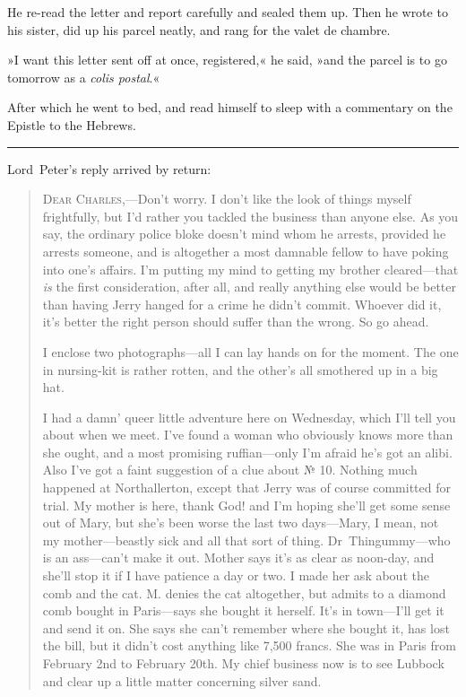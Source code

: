 He re-read the letter and report carefully and sealed them up. Then he wrote to his sister, did up his parcel neatly, and rang for the valet de chambre.

»I want this letter sent off at once, registered,« he said, »and the parcel is to go tomorrow as a \textit{colis postal}.«

After which he went to bed, and read himself to sleep with a commentary on the Epistle to the Hebrews.

\noindent\hfil\rule{0.5\textwidth}{.4pt}\hfil

Lord~Peter's reply arrived by return:

\begin{quotation}

\textsc{Dear Charles},—Don't worry. I don't like the look of things myself frightfully, but I'd rather you tackled the business than anyone else. As you say, the ordinary police bloke doesn't mind whom he arrests, provided he arrests someone, and is altogether a most damnable fellow to have poking into one's affairs. I'm putting my mind to getting my brother cleared—that \textit{is} the first consideration, after all, and really anything else would be better than having Jerry hanged for a crime he didn't commit. Whoever did it, it's better the right person should suffer than the wrong. So go ahead.

I enclose two photographs—all I can lay hands on for the moment. The one in nursing-kit is rather rotten, and the other's all smothered up in a big hat.

I had a damn' queer little adventure here on Wednesday, which I'll tell you about when we meet. I've found a woman who obviously knows more than she ought, and a most promising ruffian—only I'm afraid he's got an alibi. Also I've got a faint suggestion of a clue about № 10. Nothing much happened at Northallerton, except that Jerry was of course committed for trial. My mother is here, thank God! and I'm hoping she'll get some sense out of Mary, but she's been worse the last two days—Mary, I mean, not my mother—beastly sick and all that sort of thing. Dr~Thingummy—who is an ass—can't make it out. Mother says it's as clear as noon-day, and she'll stop it if I have patience a day or two. I made her ask about the comb and the cat. M. denies the cat altogether, but admits to a diamond comb bought in Paris—says she bought it herself. It's in town—I'll get it and send it on. She says she can't remember where she bought it, has lost the bill, but it didn't cost anything like 7,500 francs. She was in Paris from February 2nd to February 20th. My chief business now is to see Lubbock and clear up a little matter concerning silver sand.


\end{quotation}
